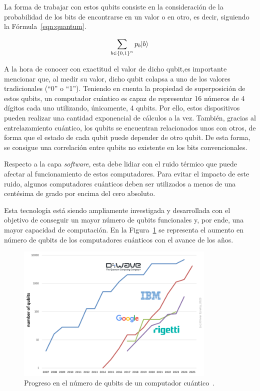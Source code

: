 La forma de trabajar con estos qubits consiste en la consideración de la probabilidad de los bits de encontrarse en un valor o en otro, es decir, siguiendo la Fórmula~\ref{eqn:quantum}.

\begin{equation}\label{eqn:quantum}
    \sum_{b\in {\{0, 1\}}^n} p_b \lvert b\rangle
\end{equation}

A la hora de conocer con exactitud el valor de dicho qubit,es importante mencionar que, al medir su valor, dicho qubit colapsa a uno de los valores tradicionales (``0'' o ``1'').
Teniendo en cuenta la propiedad de superposición de estos qubits, un computador cuántico es capaz de representar 16 números de 4 dígitos cada uno utilizando, únicamente, 4 qubits.
Por ello, estos dispositivos pueden realizar una cantidad exponencial de cálculos a la vez.
También, gracias al entrelazamiento cuántico, los qubits se encuentran relacionados unos con otros, de forma que el estado de cada qubit puede depender de otro qubit.
De esta forma, se consigue una correlación entre qubits no existente en los bits convencionales.

Respecto a la capa \textit{software}, esta debe lidiar con el ruido térmico que puede afectar al funcionamiento de estos computadores.
Para evitar el impacto de este ruido, algunos computadores cuánticos deben ser utilizados a menos de una centésima de grado por encima del cero absoluto.

Esta tecnología está siendo ampliamente investigada y desarrollada con el objetivo de conseguir un mayor número de qubits funcionales y, por ende, una mayor capacidad de computación.
En la Figura~\ref{fig:progress-qubits} se representa el aumento en número de qubits de los computadores cuánticos con el avance de los años.

\begin{figure}[h]
    \centering
    \includegraphics[width=0.85\textwidth]{figures/progress-qubits.png}
    \caption{Progreso en el número de qubits de un computador cuántico~\cite{progress-qubits}.}
    \label{fig:progress-qubits}
\end{figure}

